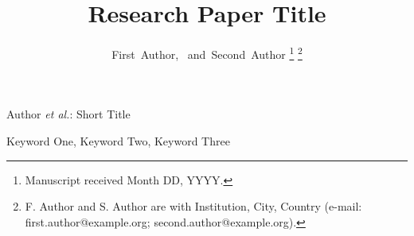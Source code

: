 \documentclass[journal]{IEEEtran}
\begin{document}
\title{Research Paper Title}

\author{First~Author,~
        and~Second~Author%
\thanks{Manuscript received Month DD, YYYY.}%
\thanks{F. Author and S. Author are with Institution, City, Country
(e-mail: first.author@example.org; second.author@example.org).}}

%
{Author \MakeLowercase{\textit{et al.}}: Short Title}

\maketitle

\begin{abstract}

\end{abstract}

\begin{IEEEkeywords}
Keyword One, Keyword Two, Keyword Three
\end{IEEEkeywords}



\makeatletter\let\@noitemerr\relax\makeatother


\end{document}
